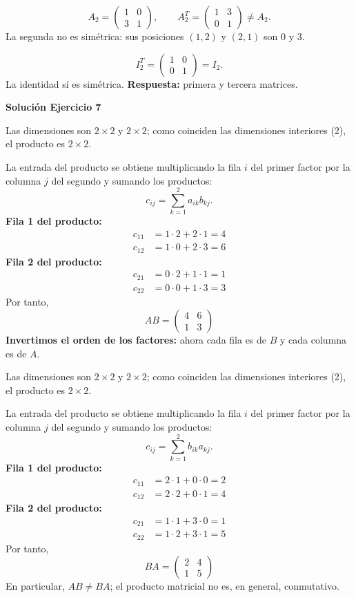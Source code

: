 \[
A_2=\begin{pmatrix}1&0\\3&1\end{pmatrix},\qquad A_2^T=\begin{pmatrix}1&3\\0&1\end{pmatrix}\ne A_2.
\]
La segunda no es simétrica: sus posiciones $(1,2)$ y $(2,1)$ son $0$ y $3$.

\[
I_2^T=\begin{pmatrix}1&0\\0&1\end{pmatrix}=I_2.
\]
La identidad sí es simétrica. \textbf{Respuesta:} primera y tercera matrices.


\par\bigskip\noindent\textbf{Solución Ejercicio 7}\par\nobreak
Las dimensiones son $2\times2$ y $2\times2$; como coinciden las dimensiones interiores (2), el producto es $2\times2$.

La entrada del producto se obtiene multiplicando la fila $i$ del primer factor por la columna $j$ del segundo y sumando los productos:
\[
c_{ij}=\sum_{k=1}^{2} a_{ik}b_{kj}.
\]
\textbf{Fila 1 del producto:}
\[
\begin{aligned}c_{11}&=1\cdot 2+2\cdot 1=4\\c_{12}&=1\cdot 0+2\cdot 3=6\end{aligned}
\]
\textbf{Fila 2 del producto:}
\[
\begin{aligned}c_{21}&=0\cdot 2+1\cdot 1=1\\c_{22}&=0\cdot 0+1\cdot 3=3\end{aligned}
\]
Por tanto,
\[
\boxed{AB=\begin{pmatrix}4&6\\1&3\end{pmatrix}}
\]
\textbf{Invertimos el orden de los factores:} ahora cada fila es de $B$ y cada columna es de $A$.

Las dimensiones son $2\times2$ y $2\times2$; como coinciden las dimensiones interiores (2), el producto es $2\times2$.

La entrada del producto se obtiene multiplicando la fila $i$ del primer factor por la columna $j$ del segundo y sumando los productos:
\[
c_{ij}=\sum_{k=1}^{2} b_{ik}a_{kj}.
\]
\textbf{Fila 1 del producto:}
\[
\begin{aligned}c_{11}&=2\cdot 1+0\cdot 0=2\\c_{12}&=2\cdot 2+0\cdot 1=4\end{aligned}
\]
\textbf{Fila 2 del producto:}
\[
\begin{aligned}c_{21}&=1\cdot 1+3\cdot 0=1\\c_{22}&=1\cdot 2+3\cdot 1=5\end{aligned}
\]
Por tanto,
\[
\boxed{BA=\begin{pmatrix}2&4\\1&5\end{pmatrix}}
\]
En particular, $AB\ne BA$; el producto matricial no es, en general, conmutativo.


